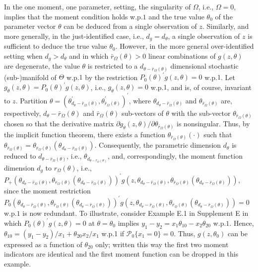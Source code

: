 \documentclass[hidelinks, 11 pt, a4paper, pdflatex]{article}
\begin{document}
{   In the one moment, one parameter, setting, the singularity of $\Omega$, i.e., $\Omega = 0$, implies that the moment condition holds w.p.$1$ and the true value $\theta_0$ of the parameter vector $\theta$ can be deduced from a single observation of $z$. Similarly, and more generally, in the just-identified case, i.e., $d_g = d_{\theta}$, a single observation of $z$ is sufficient to deduce the true value $\theta_0$. However, in the more general over-identified setting when $d_g > d_{\theta}$ and in which $\bar{r}_{\Omega}(\theta) > 0$ linear combinations  of $g(z,\theta)$ are degenerate, the value $\theta$ is restricted to a $d_{\theta-\bar{r}_{\Omega}(\theta)}$ dimensional stochastic (sub-)manifold of $\Theta$ w.p.$1$ by the restriction $P_0(\theta)^{\prime}g(z,\theta) = 0$ w.p.$1$. Let $g_{\theta}(z,\theta) = P_0(\theta)^{\prime}g(z,\theta)$, i.e., $g_{\theta}(z,\theta) = 0$ w.p.$1$, and is, of course, invariant to $z$. Partition $\theta = (\theta_{d_{\theta}-\bar{r}_{\Omega}(\theta)}^{\prime},\theta_{\bar{r}_{\Omega}(\theta)}^{\prime})^{\prime}$, where $\theta_{d_{\theta}-\bar{r}_{\Omega}(\theta)}$ and $\theta_{\bar{r}_{\Omega}(\theta)}$ are, respectively, $d_{\theta}-\bar{r}_{\Omega}(\theta)$ and $\bar{r}_{\Omega}(\theta)$ sub-vectors of $\theta$ with the sub-vector $\theta_{\bar{r}_{\Omega}(\theta)}$ chosen so that the derivative matrix $\partial g_{\theta}(z,\theta)/ \partial \theta_{\bar{r}_{\Omega}(\theta)}$ is nonsingular. Thus, by the implicit function theorem, there exists a function $\theta_{\bar{r}_{\Omega}(\theta)}(\cdot)$ such that $\theta_{\bar{r}_{\Omega}(\theta)} = \theta_{\bar{r}_{\Omega}(\theta)}(\theta_{d_{\theta}-\bar{r}_{\Omega}(\theta)})$. Consequently, the parametric dimension $d_{\theta}$ is reduced to $d_{\theta-\bar{r}_{\Omega}(\theta)}$, i.e., $\theta_{d_{\theta-\bar{r}_{\Omega}(\theta)}}$, and, correspondingly, the moment function dimension $d_g$ to $r_{\Omega}(\theta)$, i.e., $P_+(\theta_{d_{\theta}-\bar{r}_{\Omega}(\theta)},\theta_{\bar{r}_{\Omega}(\theta)}(\theta_{d_{\theta}-\bar{r}_{\Omega}(\theta)}))^{\prime} g(z,\theta_{d_{\theta}-\bar{r}_{\Omega}(\theta)},\theta_{\bar{r}_{\Omega}(\theta)}(\theta_{d_{\theta}-\bar{r}_{\Omega}(\theta)}))$, since the moment restriction $P_0(\theta_{d_{\theta}-\bar{r}_{\Omega}(\theta)},\theta_{\bar{r}_{\Omega}(\theta)}(\theta_{d_{\theta}-\bar{r}_{\Omega}(\theta)}))^{\prime} g(z,\theta_{d_{\theta}-\bar{r}_{\Omega}(\theta)},\theta_{\bar{r}_{\Omega}(\theta)}(\theta_{d_{\theta}-\bar{r}_{\Omega}(\theta)})) = 0$ w.p.$1$ is now redundant. To illustrate, consider Example E.1 in Supplement E in which $P_0(\theta)^{\prime}g(z,\theta) = 0$ at $\theta = \theta_0$ implies $y_{1} - y_{2} = x_{1}\theta_{10} - x_{2}\theta_{20}$  w.p.$1$. Hence, $\theta_{10} = (y_{1} - y_{2})/x_{1} + \theta_{20} x_{2}/x_{1}$ w.p.1 if $\mathcal{P}_0\{x_{1} = 0\} = 0$. Thus, $g(z,\theta_0)$ can be expressed as a function of $\theta_{20}$ only; written this way the first two moment indicators are identical and the first moment function can be dropped in this example.
	
}
\end{document}
